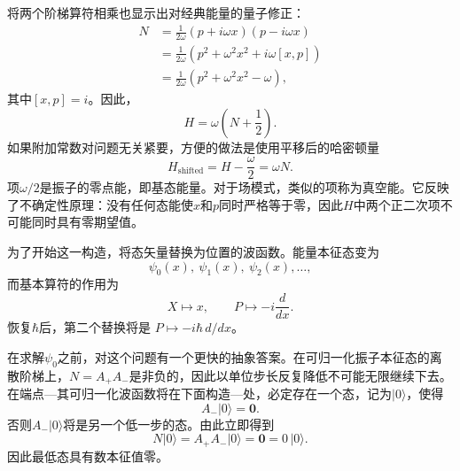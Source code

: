 将两个阶梯算符相乘也显示出对经典能量的量子修正：
\begin{align}
N
&=\frac{1}{2\omega}(p+i\omega x)(p-i\omega x)\\
&=\frac{1}{2\omega}\left(p^{2}+\omega^{2}x^{2}
 +i\omega[x,p]\right)\\
&=\frac{1}{2\omega}\left(p^{2}+\omega^{2}x^{2}-\omega\right),
\end{align}
其中\([x,p]=i\)。因此，
\begin{equation}
H=\omega\left(N+\frac12\right).
\end{equation}
如果附加常数对问题无关紧要，方便的做法是使用平移后的哈密顿量
\begin{equation}
H_{\mathrm{shifted}}=H-\frac{\omega}{2}=\omega N.
\end{equation}
项\(\omega/2\)是振子的零点能，即基态能量。对于场模式，类似的项称为真空能。它反映了不确定性原理：没有任何态能使\(x\)和\(p\)同时严格等于零，因此\(H\)中两个正二次项不可能同时具有零期望值。

\begin{classroomqa}
\end{classroomqa}

为了开始这一构造，将态矢量替换为位置的波函数。能量本征态变为
\[
\psi_{0}(x),\ \psi_{1}(x),\ \psi_{2}(x),\ldots,
\]
而基本算符的作用为
\begin{equation}
X\longmapsto x,\qquad
P\longmapsto -i\frac{d}{dx}.
\end{equation}
恢复\(\hbar\)后，第二个替换将是
\(P\mapsto-i\hbar\,d/dx\)。

在求解\(\psi_{0}\)之前，对这个问题有一个更快的抽象答案。在可归一化振子本征态的离散阶梯上，\(N=A_{+}A_{-}\)是非负的，因此以单位步长反复降低不可能无限继续下去。在端点---其可归一化波函数将在下面构造---处，必定存在一个态，记为\(\lvert0\rangle\)，使得
\begin{equation}
A_{-}\lvert0\rangle=\mathbf 0.
\end{equation}
否则\(A_{-}\lvert0\rangle\)将是另一个低一步的态。由此立即得到
\begin{equation}
N\lvert0\rangle
=A_{+}A_{-}\lvert0\rangle
=\mathbf 0
=0\,\lvert0\rangle.
\end{equation}
因此最低态具有数本征值零。

\begin{classroomqa}
\end{classroomqa}

